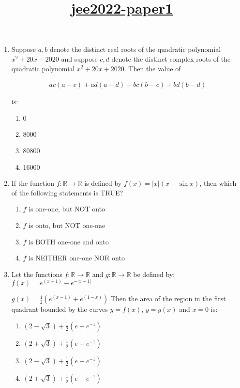 \documentclass{article}
\title{\underline{\textbf{jee2022-paper1}}}
\date{}
\begin{document}
\maketitle
\begin{enumerate}   

\item  Suppose $a, b$ denote the distinct real roots of the quadratic polynomial $x^2+20x-2020$ and suppose $c, d$ denote the distinct complex roots of the quadratic polynomial $x^2+20x+2020$. Then the value of

	\begin{align}
     ac(a - c) + ad(a - d) + bc(b - c) + bd(b - d)
	\end{align}

    is:
    
    \begin{enumerate}
        \item  0
        \item  8000
        \item  80800
        \item  16000
    \end{enumerate}

\item   If the function $f: \mathbb{R} \to \mathbb{R}$ is defined by $f(x)=|x|(x-\sin x)$, then which of the following statements is TRUE?

    \begin{enumerate}
        \item  $f$ is one-one, but NOT onto
        \item  $f$ is onto, but NOT one-one
        \item  $f$ is BOTH one-one and onto
        \item  $f$ is NEITHER one-one NOR onto
    \end{enumerate}



\item Let the functions $f: \mathbb{R} \to \mathbb{R}$ and $g: \mathbb{R} \to \mathbb{R}$ be defined by:
$f(x) = e^{(x - 1)} - e^{- |x - 1|}$  

		$g(x) = \frac{1}{2} ( e^{(x - 1)} + e^{(1 - x)} )$ 
    Then the area of the region in the first quadrant bounded by the curves $y = f(x)$, $y = g(x)$ and $x = 0$ is:

    \begin{enumerate}
        \item  $(2 - \sqrt{3}) + \frac{1}{2} (e - e^{-1})$
        \item  $(2 + \sqrt{3}) + \frac{1}{2} (e - e^{-1})$
        \item  $(2 - \sqrt{3}) + \frac{1}{2} (e + e^{-1})$
        \item  $(2 + \sqrt{3}) + \frac{1}{2} (e + e^{-1})$
    \end{enumerate}


\end{enumerate}
\end{document}
